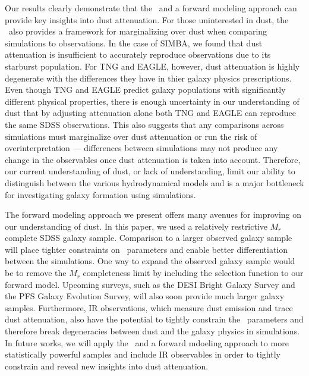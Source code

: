 Our results clearly demonstrate that the \eda~and a forward modeling approach
can provide key insights into dust attenuation. For those uninterested in dust,
the \eda~also provides a framework for marginalizing over dust when comparing
simulations to observations. In the case of SIMBA, we found that dust
attenuation is insufficient to accurately reproduce observations due to its 
starburst population. For TNG and EAGLE, however, dust attenuation is highly
degenerate with the differences they have in thier galaxy physics
prescriptions. Even though TNG and EAGLE predict galaxy populations with
significantly different physical properties, there is enough uncertainty in our
understanding of dust that by adjusting attenuation alone both TNG and EAGLE
can reproduce the same SDSS observations. This also suggests that any
comparisons across simulations must marginalize over dust attenuation or run 
the risk of overinterpretation --- differences between simulations may not
produce any change in the observables once dust attenuation is taken into account. 
Therefore, our current understanding of dust, or lack of understanding, limit
our ability to distinguish between the various hydrodynamical models and is a
major bottleneck for investigating galaxy formation using simulations.

The forward modeling approach we present offers many avenues for improving on
our understanding of dust. In this paper, we used a relatively restrictive 
$M_r$ complete SDSS galaxy sample. Comparison to a larger observed galaxy
sample will place tighter constraints on \eda~parameters and enable better
differentiation between the simulations. One way to expand the observed galaxy
sample would be to remove the $M_r$ completeness limit by including the
selection function to our forward model. Upcoming surveys, such as the DESI
Bright Galaxy Survey and the PFS Galaxy Evolution Survey, will also soon
provide much larger galaxy samples. Furthermore, IR observations, which measure
dust emission and trace dust attenuation, also have the potential to tightly 
constrain the \eda~parameters and therefore break degeneracies between dust
and the galaxy physics in simulations. In future works, we will apply the
\eda~and a forward mdoeling approach to more statistically powerful samples and
include IR observables in order to tightly constrain and reveal new insights 
into dust attenuation. 
